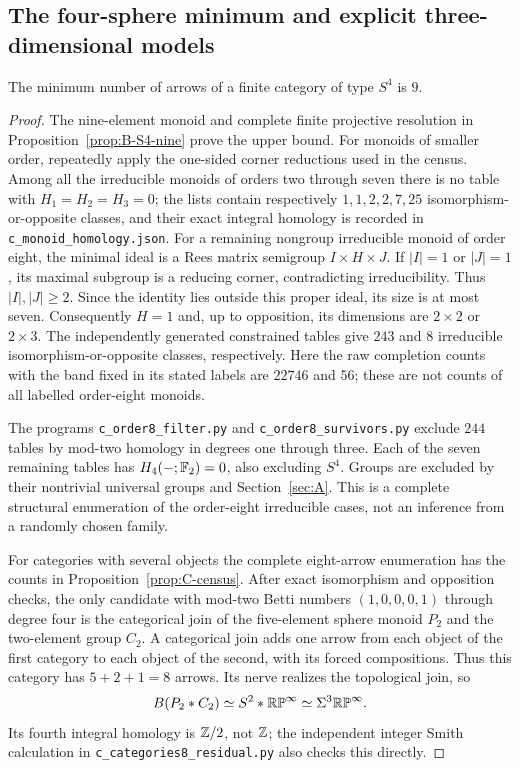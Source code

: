 \subsection{The four-sphere minimum and explicit three-dimensional models}
\begin{theorem}\label{thm:C-S4-nine}
The minimum number of arrows of a finite category of type $S^4$ is $9$.
\end{theorem}
\begin{proof}
The nine-element monoid and complete finite projective resolution in
Proposition~\ref{prop:B-S4-nine} prove the upper bound.
For monoids of smaller order, repeatedly apply the one-sided corner
reductions used in the census. Among all the irreducible monoids of
orders two through seven there is no table with
$H_1=H_2=H_3=0$; the lists contain respectively $1,1,2,2,7,25$
isomorphism-or-opposite classes, and their exact integral homology
is recorded in \texttt{c\_monoid\_homology.json}.
For a remaining nongroup irreducible monoid of order eight, the
minimal ideal is a Rees matrix semigroup $I\times H\times J$.
If $|I|=1$ or $|J|=1$, its maximal subgroup is a reducing corner,
contradicting irreducibility. Thus $|I|,|J|\ge2$.
Since the identity lies outside this proper ideal, its size is at
most seven. Consequently $H=1$ and, up to opposition, its dimensions
are $2\times2$ or $2\times3$.
The independently generated constrained tables give $243$ and $8$
irreducible isomorphism-or-opposite classes, respectively.
Here the raw completion counts with the band fixed in its stated
labels are $22746$ and $56$; these are not counts of all labelled
order-eight monoids.

The programs \texttt{c\_order8\_filter.py} and
\texttt{c\_order8\_survivors.py} exclude $244$ tables by mod-two
homology in degrees one through three. Each of the seven remaining
tables has $H_4(-;\mathbb F_2)=0$, also excluding $S^4$.
Groups are excluded by their nontrivial universal groups and
Section~\ref{sec:A}. This is a complete structural enumeration of
the order-eight irreducible cases, not an inference from a randomly
chosen family.

For categories with several objects the complete eight-arrow
enumeration has the counts in Proposition~\ref{prop:C-census}.
After exact isomorphism and opposition checks, the only candidate
with mod-two Betti numbers $(1,0,0,0,1)$ through degree four is
the categorical join of the five-element sphere monoid $P_2$ and
the two-element group $C_2$. A categorical join adds one arrow
from each object of the first category to each object of the second,
with its forced compositions. Thus this category has
$5+2+1=8$ arrows. Its nerve realizes the topological join, so
\[
 B(P_2*C_2)\simeq S^2*\mathbb {RP}^\infty
 \simeq\Sigma^3\mathbb {RP}^\infty.
\]
Its fourth integral homology is $\mathbb Z/2$, not $\mathbb Z$; the independent
integer Smith calculation in \texttt{c\_categories8\_residual.py}
also checks this directly.


\end{proof}
